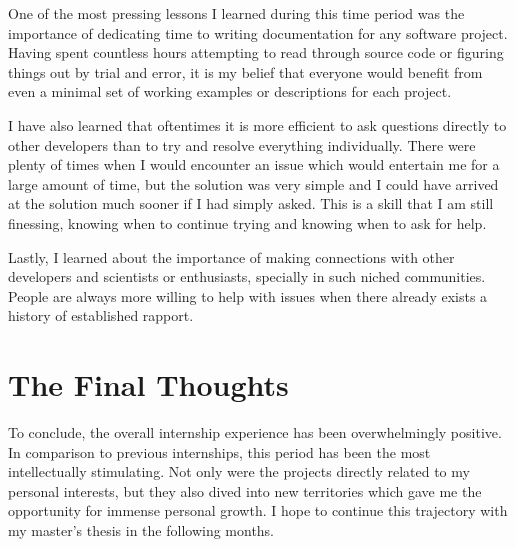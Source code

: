         One of the most pressing lessons I learned during this time period was the importance of dedicating time to writing documentation for any software project. Having spent countless hours attempting to read through source code or figuring things out by trial and error, it is my belief that everyone would benefit from even a minimal set of working examples or descriptions for each project.

        I have also learned that oftentimes it is more efficient to ask questions directly to other developers than to try and resolve everything individually. There were plenty of times when I would encounter an issue which would entertain me for a large amount of time, but the solution was very simple and I could have arrived at the solution much sooner if I had simply asked. This is a skill that I am still finessing, knowing when to continue trying and knowing when to ask for help.

        Lastly, I learned about the importance of making connections with other developers and scientists or enthusiasts, specially in such niched communities. People are always more willing to help with issues when there already exists a history of established rapport.


    \pagebreak

    \section*{The Final Thoughts}

        To conclude, the overall internship experience has been overwhelmingly positive. In comparison to previous internships, this period has been the most intellectually stimulating. Not only were the projects directly related to my personal interests, but they also dived into new territories which gave me the opportunity for immense personal growth. I hope to continue this trajectory with my master's thesis in the following months.
